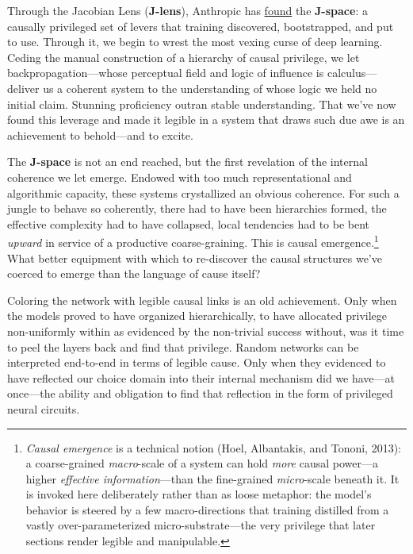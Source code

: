 \documentclass{article}
\begin{document}
Through the Jacobian Lens (\textbf{J-lens}), Anthropic has \href{https://transformer-circuits.pub/2026/workspace/index.html}{found} the \textbf{J-space}: a causally privileged set of levers that training discovered, bootstrapped, and put to use. Through it, we begin to wrest the most vexing curse of deep learning. Ceding the manual construction of a hierarchy of causal privilege, we let backpropagation---whose perceptual field and logic of influence is calculus---deliver us a coherent system to the understanding of whose logic we held no initial claim. Stunning proficiency outran stable understanding. That we've now found this leverage and made it legible in a system that draws such due awe is an achievement to behold---and to excite.

The \textbf{J-space} is not an end reached, but the first revelation of the internal coherence we let emerge. Endowed with too much representational and algorithmic capacity, these systems crystallized an obvious coherence. For such a jungle to behave so coherently, there had to have been hierarchies formed, the effective complexity had to have collapsed, local tendencies had to be bent \textit{upward} in service of a productive coarse-graining. This is causal emergence.\footnote{\textit{Causal emergence} is a technical notion (Hoel, Albantakis, and Tononi, 2013): a coarse-grained \textit{macro}-scale of a system can hold \textit{more} causal power---a higher \textit{effective information}---than the fine-grained \textit{micro}-scale beneath it. It is invoked here deliberately rather than as loose metaphor: the model's behavior is steered by a few macro-directions that training distilled from a vastly over-parameterized micro-substrate---the very privilege that later sections render legible and manipulable.} What better equipment with which to re-discover the causal structures we've coerced to emerge than the language of cause itself?

Coloring the network with legible causal links is an old achievement. Only when the models proved to have organized hierarchically, to have allocated privilege non-uniformly within as evidenced by the non-trivial success without, was it time to peel the layers back and find that privilege. Random networks can be interpreted end-to-end in terms of legible cause. Only when they evidenced to have reflected our choice domain into their internal mechanism did we have---at once---the ability and obligation to find that reflection in the form of privileged neural circuits.
\end{document}
